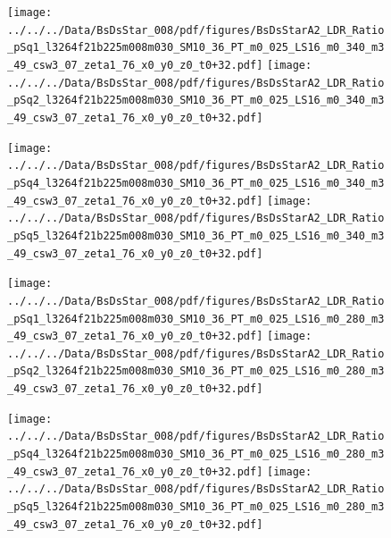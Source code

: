\documentclass[a4paper,10pt]{article}
\begin{document}
\begin{figure}[p]
 \texttt{[image: ../../../Data/BsDsStar\_008/pdf/figures/BsDsStarA2\_LDR\_Ratio\_pSq1\_l3264f21b225m008m030\_SM10\_36\_PT\_m0\_025\_LS16\_m0\_340\_m3\_49\_csw3\_07\_zeta1\_76\_x0\_y0\_z0\_t0+32.pdf]} 
 \texttt{[image: ../../../Data/BsDsStar\_008/pdf/figures/BsDsStarA2\_LDR\_Ratio\_pSq2\_l3264f21b225m008m030\_SM10\_36\_PT\_m0\_025\_LS16\_m0\_340\_m3\_49\_csw3\_07\_zeta1\_76\_x0\_y0\_z0\_t0+32.pdf]} 
 \end{figure}
\begin{figure}[p]
 \texttt{[image: ../../../Data/BsDsStar\_008/pdf/figures/BsDsStarA2\_LDR\_Ratio\_pSq4\_l3264f21b225m008m030\_SM10\_36\_PT\_m0\_025\_LS16\_m0\_340\_m3\_49\_csw3\_07\_zeta1\_76\_x0\_y0\_z0\_t0+32.pdf]} 
 \texttt{[image: ../../../Data/BsDsStar\_008/pdf/figures/BsDsStarA2\_LDR\_Ratio\_pSq5\_l3264f21b225m008m030\_SM10\_36\_PT\_m0\_025\_LS16\_m0\_340\_m3\_49\_csw3\_07\_zeta1\_76\_x0\_y0\_z0\_t0+32.pdf]} 
 \end{figure}
\begin{figure}[p]
 \texttt{[image: ../../../Data/BsDsStar\_008/pdf/figures/BsDsStarA2\_LDR\_Ratio\_pSq1\_l3264f21b225m008m030\_SM10\_36\_PT\_m0\_025\_LS16\_m0\_280\_m3\_49\_csw3\_07\_zeta1\_76\_x0\_y0\_z0\_t0+32.pdf]} 
 \texttt{[image: ../../../Data/BsDsStar\_008/pdf/figures/BsDsStarA2\_LDR\_Ratio\_pSq2\_l3264f21b225m008m030\_SM10\_36\_PT\_m0\_025\_LS16\_m0\_280\_m3\_49\_csw3\_07\_zeta1\_76\_x0\_y0\_z0\_t0+32.pdf]} 
 \end{figure}
\clearpage
\begin{figure}[p]
 \texttt{[image: ../../../Data/BsDsStar\_008/pdf/figures/BsDsStarA2\_LDR\_Ratio\_pSq4\_l3264f21b225m008m030\_SM10\_36\_PT\_m0\_025\_LS16\_m0\_280\_m3\_49\_csw3\_07\_zeta1\_76\_x0\_y0\_z0\_t0+32.pdf]} 
 \texttt{[image: ../../../Data/BsDsStar\_008/pdf/figures/BsDsStarA2\_LDR\_Ratio\_pSq5\_l3264f21b225m008m030\_SM10\_36\_PT\_m0\_025\_LS16\_m0\_280\_m3\_49\_csw3\_07\_zeta1\_76\_x0\_y0\_z0\_t0+32.pdf]} 
 \end{figure}
\clearpage
\end{document}
